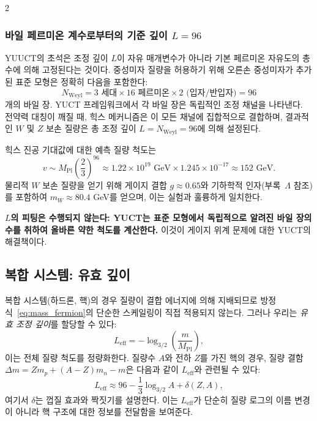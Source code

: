 \documentclass[11pt,a4paper]{article}
\begin{document}
\begin{multicols}{2}
		\subsubsection{바일 페르미온 계수로부터의 기준 깊이 $L=96$}
		
		YUUCT의 초석은 조정 깊이 $L$이 자유 매개변수가 아니라 기본 페르미온 자유도의 총수에 의해 고정된다는 것이다. 중성미자 질량을 허용하기 위해 오른손 중성미자가 추가된 표준 모형은 정확히 다음을 포함한다:
		\scriptsize
		\[
		N_{\text{Weyl}} = 3 \text{ 세대} \times 16 \text{ 페르미온} \times 2 \text{ (입자/반입자)} = 96
		\]
		\small
		개의 바일 장. YUCT 프레임워크에서 각 바일 장은 독립적인 조정 채널을 나타낸다. 전약력 대칭이 깨질 때, 힉스 메커니즘은 이 모든 채널에 집합적으로 결합하며, 결과적인 $W$ 및 $Z$ 보손 질량은 총 조정 깊이 $L = N_{\text{Weyl}} = 96$에 의해 설정된다.
		
		힉스 진공 기대값에 대한 예측 질량 척도는
		\begin{equation}
			v \sim M_{\mathrm{Pl}} \left( \frac{2}{3} \right)^{96} \approx 1.22 \times 10^{19} \text{ GeV} \times 1.245\times10^{-17} \approx 152 \text{ GeV}.
		\end{equation}
		물리적 $W$ 보손 질량을 얻기 위해 게이지 결합 $g \approx 0.65$와 기하학적 인자(부록~$\Lambda$ 참조)를 포함하여 $m_W \approx 80.4$ GeV를 얻으며, 이는 실험과 훌륭하게 일치한다.
		
		\textbf{$L$의 피팅은 수행되지 않는다: YUCT는 표준 모형에서 독립적으로 알려진 바일 장의 수를 취하여 올바른 약한 척도를 계산한다.} 이것이 게이지 위계 문제에 대한 YUCT의 해결책이다.
		
		\subsection{복합 시스템: 유효 깊이}
		
		복합 시스템(하드론, 핵)의 경우 질량이 결합 에너지에 의해 지배되므로 방정식~\eqref{eq:mass_fermion}의 단순한 스케일링이 직접 적용되지 않는다. 그러나 우리는 \emph{유효 조정 깊이}를 할당할 수 있다:
		\begin{equation}
			L_{\mathrm{eff}} = -\log_{3/2}\left( \frac{m}{M_{\mathrm{Pl}}} \right),
			\label{eq:Leff}
		\end{equation}
		이는 전체 질량 척도를 정량화한다. 질량수 \(A\)와 전하 \(Z\)를 가진 핵의 경우, 질량 결함 \(\Delta m = Z m_p + (A-Z) m_n - m\)은 다음과 같이 \(L_{\mathrm{eff}}\)와 관련될 수 있다:
		\begin{equation}
			L_{\mathrm{eff}} \approx 96 - \frac{1}{3} \log_{3/2} A + \delta(Z,A),
		\end{equation}
		여기서 \(\delta\)는 껍질 효과와 짝짓기를 설명한다. 이는 \(L_{\mathrm{eff}}\)가 단순히 질량 로그의 이름 변경이 아니라 핵 구조에 대한 정보를 전달함을 보여준다.
		
	\end{multicols}
	
\end{document}
